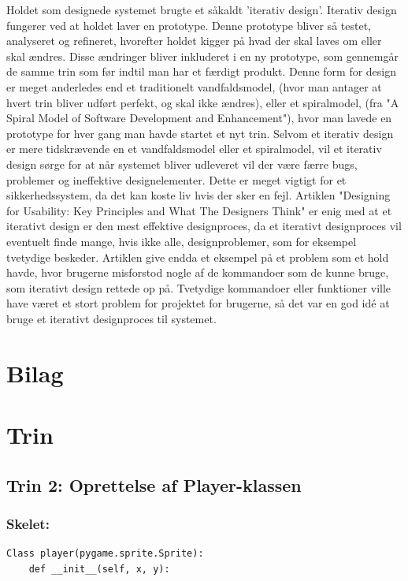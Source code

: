 \documentclass[10pt,a4paper,danish]{article}
\begin{document}
Holdet som designede systemet brugte et såkaldt 'iterativ design'. Iterativ design fungerer ved at holdet 
laver en prototype. Denne prototype bliver så testet, analyseret og refineret, hvorefter holdet kigger 
på hvad der skal laves om eller skal ændres. Disse ændringer bliver inkluderet i en ny prototype, som gennemgår 
de samme trin som før indtil man har et færdigt produkt. Denne form for design er meget anderledes end et 
traditionelt vandfaldsmodel, (hvor man antager at hvert trin bliver udført perfekt, og skal ikke ændres), eller et 
spiralmodel, (fra "A Spiral Model of Software Development and Enhancement"), hvor man lavede en prototype  
for hver gang man havde startet et nyt trin. Selvom et iterativ design er mere tidskrævende en et 
vandfaldsmodel eller et spiralmodel, vil et iterativ design sørge for at når systemet bliver udleveret 
vil der være færre bugs, problemer og ineffektive designelementer. Dette er meget vigtigt for et sikkerhedssystem, 
da det kan koste liv hvis der sker en fejl. Artiklen "Designing for Usability: Key Principles and What The Designers 
Think" er enig med at et iterativt design er den mest effektive designproces, da et iterativt designproces vil eventuelt 
finde mange, hvis ikke alle, designproblemer, som for eksempel tvetydige beskeder. Artiklen give endda et eksempel 
på et problem som et hold havde, hvor brugerne misforstod nogle af de kommandoer som de kunne bruge, som iterativt design 
rettede op på. Tvetydige kommandoer eller funktioner ville have været et stort problem for projektet for brugerne, så 
det var en god idé at bruge et iterativt designproces til systemet.

\section{Bilag}
\section{Trin}
\subsection{Trin 2: Oprettelse af Player-klassen}
\subsubsection{Skelet:}
\begin{verbatim}
Class player(pygame.sprite.Sprite):
    def __init__(self, x, y):
\end{verbatim}
\end{document}
